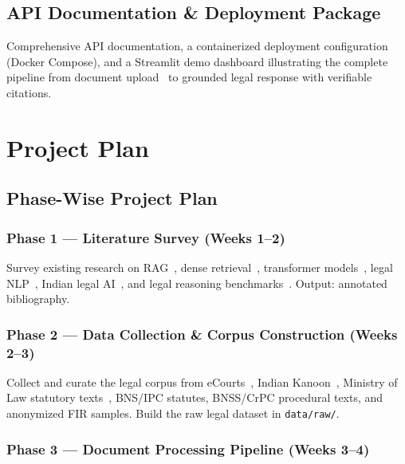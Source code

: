 \documentclass[12pt,a4paper]{article}
\begin{document}
\subsection{API Documentation \& Deployment Package}

Comprehensive API documentation, a containerized deployment configuration (Docker
Compose), and a Streamlit demo dashboard illustrating the complete pipeline from
document upload~\cite{ecourts} to grounded legal response with verifiable citations.

\section{Project Plan}

\subsection{Phase-Wise Project Plan}

\subsubsection{Phase 1 --- Literature Survey (Weeks 1--2)}

Survey existing research on RAG~\cite{lewis2020rag}, dense retrieval~\cite{reimers2019sbert},
transformer models~\cite{vaswani2017attention, devlin2019bert}, legal NLP~\cite{feng2022survey,
cui2022survey, ashley2017ai}, Indian legal AI~\cite{ecourts, indiankanoon}, and
legal reasoning benchmarks~\cite{guha2023legalbench}. Output: annotated bibliography.

\subsubsection{Phase 2 --- Data Collection \& Corpus Construction (Weeks 2--3)}

Collect and curate the legal corpus from eCourts~\cite{ecourts}, Indian
Kanoon~\cite{indiankanoon}, Ministry of Law statutory texts~\cite{mlaw}, BNS/IPC
statutes, BNSS/CrPC procedural texts, and anonymized FIR samples. Build the raw
legal dataset in \texttt{data/raw/}.

\subsubsection{Phase 3 --- Document Processing Pipeline (Weeks 3--4)}
\end{document}
